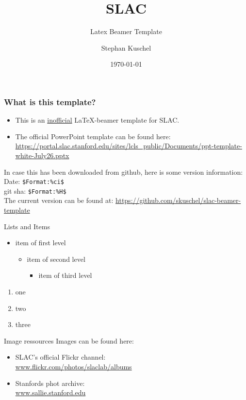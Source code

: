\documentclass{beamer}
\title{SLAC}
\subtitle{Latex Beamer Template}
\author{Stephan Kuschel}
\institute{SLAC National Accelerator Laboratory}
\date{\today}
\begin{document}
\frame{\titlepage}


\begin{frame}[fragile]
\frametitle{What is this template?}
\begin{itemize}
\item This is an \underline{inofficial} \LaTeX-beamer template for SLAC.
\item The official PowerPoint template can be found here: \\
\url{https://portal.slac.stanford.edu/sites/lcls_public/Documents/ppt-template-white-July26.pptx}
\end{itemize}
In case this has been downloaded from github, here is some version information: \\
Date: \verb|$Format:%ci$| \\
git sha: \verb|$Format:%H$| \\[1em]
The current version can be found at:
\url{https://github.com/skuschel/slac-beamer-template}
\end{frame}


\begin{frame}{Lists and Items}
  \begin{itemize}
    \item item of first level
    \begin{itemize}
      \item item of second level
      \begin{itemize}
        \item item of third level
      \end{itemize}
    \end{itemize}
  \end{itemize}
  \begin{enumerate}
    \item one
    \item two
    \item three
  \end{enumerate}
\end{frame}


\begin{frame}{Image ressources}
Images can be found here:
\begin{itemize}
  \item SLAC's official Flickr channel: \\
  \url{www.flickr.com/photos/slaclab/albums}
  \item Stanfords phot archive: \\
  \url{www.sallie.stanford.edu}
\end{itemize}
\end{frame}
\end{document}
